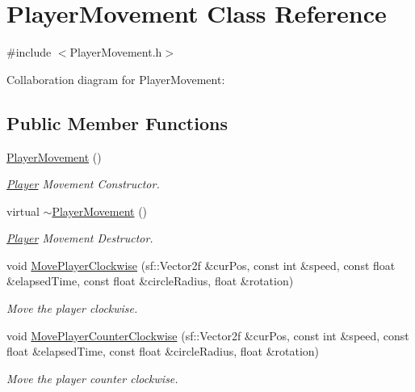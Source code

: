 \hypertarget{class_player_movement}{}\section{Player\+Movement Class Reference}
\label{class_player_movement}


{\ttfamily \#include $<$Player\+Movement.\+h$>$}



Collaboration diagram for Player\+Movement\+:
\subsection*{Public Member Functions}
\begin{DoxyCompactItemize}
\item 
\hyperlink{class_player_movement_a7b8465579dfaddd25d12b628a747253f}{Player\+Movement} ()
\begin{DoxyCompactList}\small\item\em \hyperlink{class_player}{Player} Movement Constructor. \end{DoxyCompactList}\item 
virtual \hyperlink{class_player_movement_aa685d50858cd780ca628e89b346645f9}{$\sim$\+Player\+Movement} ()
\begin{DoxyCompactList}\small\item\em \hyperlink{class_player}{Player} Movement Destructor. \end{DoxyCompactList}\item 
void \hyperlink{class_player_movement_a9975a1cdcd2243f3b142cd94230118bc}{Move\+Player\+Clockwise} (sf\+::\+Vector2f \&cur\+Pos, const int \&speed, const float \&elapsed\+Time, const float \&circle\+Radius, float \&rotation)
\begin{DoxyCompactList}\small\item\em Move the player clockwise. \end{DoxyCompactList}\item 
void \hyperlink{class_player_movement_abc231fdfdbc0f2acb2bcb38b54b1320f}{Move\+Player\+Counter\+Clockwise} (sf\+::\+Vector2f \&cur\+Pos, const int \&speed, const float \&elapsed\+Time, const float \&circle\+Radius, float \&rotation)
\begin{DoxyCompactList}\small\item\em Move the player counter clockwise. \end{DoxyCompactList}\end{DoxyCompactItemize}


